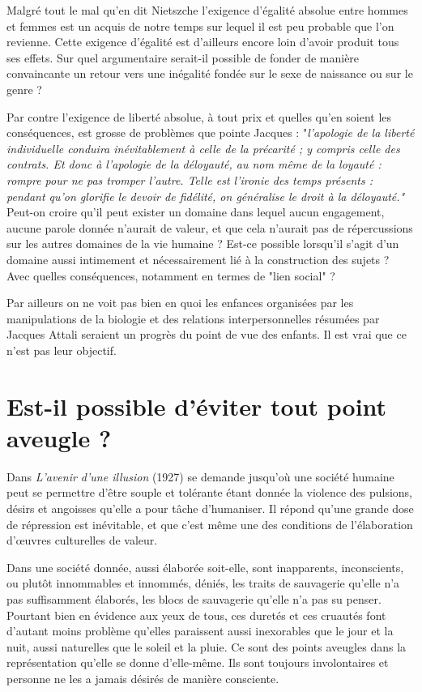  Malgré tout le mal qu'en dit Nietszche l'exigence d'égalité absolue entre hommes et femmes est un acquis de notre temps sur lequel il est peu probable que l'on revienne. Cette exigence d'égalité est d'ailleurs encore loin d'avoir produit tous ses effets. Sur quel argumentaire serait-il possible de fonder de manière convaincante un retour vers une inégalité fondée sur le sexe de naissance ou sur le genre ? 
 
 Par contre l'exigence de liberté absolue, à tout prix et quelles qu'en soient les conséquences, est grosse de problèmes que pointe Jacques  : "\emph{l'apologie de la liberté individuelle conduira inévitablement à celle de la précarité ; y compris celle des contrats. Et donc à l'apologie de la déloyauté, au nom même de la loyauté : rompre pour ne pas tromper l'autre. Telle est l'ironie des temps présents : pendant qu'on glorifie le devoir de fidélité, on généralise le droit à la déloyauté."} Peut-on croire qu'il peut exister un domaine  dans lequel aucun engagement, aucune parole donnée n'aurait de valeur, et que cela n'aurait pas de répercussions sur les autres domaines de la vie humaine ? Est-ce possible lorsqu'il s'agit d'un domaine aussi intimement et nécessairement lié à la construction des sujets ? Avec quelles conséquences, notamment en termes de "lien social" ?
 
 
 Par ailleurs on ne voit pas bien en quoi les enfances organisées par les manipulations de la biologie et des relations interpersonnelles résumées par Jacques Attali seraient un progrès du point de vue des enfants. Il est vrai que ce n'est pas leur objectif. 
 
 
 \section{Est-il possible d'éviter tout point aveugle ?} 
 
 Dans \emph{L'avenir d'une illusion} (1927)  se demande jusqu'où une société humaine peut se permettre d'être souple et tolérante étant donnée la violence des pulsions, désirs et angoisses qu'elle a pour tâche d'humaniser. Il répond qu'une grande dose de répression est inévitable, et que c'est même une des conditions de l'élaboration d'œuvres culturelles de valeur.

 Dans une société donnée, aussi élaborée soit-elle, sont inapparents, inconscients, ou plutôt innommables et innommés, déniés, les traits de sauvagerie qu'elle n'a pas suffisamment élaborés, les blocs de sauvagerie qu'elle n'a pas su penser. Pourtant bien en évidence aux yeux de tous, ces duretés et ces cruautés font d'autant moins problème qu'elles paraissent aussi inexorables que le jour et la nuit, aussi naturelles que le soleil et la pluie. Ce sont des points aveugles dans la représentation qu'elle se donne d'elle-même. Ils sont toujours involontaires et personne ne les a jamais désirés de manière consciente. 


